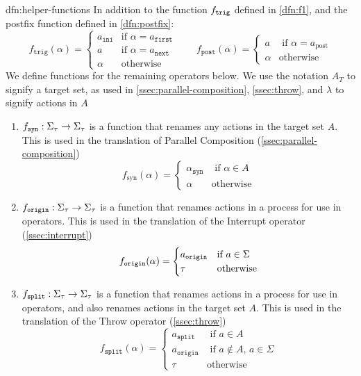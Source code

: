 \documentclass[../hons_project.tex]{subfiles}
\begin{document}
\begin{dfn}{dfn:helper-functions}{}
	In addition to the function $f_{\mathtt{trig}}$ defined in \ref{dfn:f1}, and the postfix function defined in \ref{dfn:postfix}:
	\vspace{-8pt}
	\[f_{\mathtt{trig}}(\alpha) = \begin{cases}
			a_{\mathtt{ini}} & \text{if } \alpha = a_{\mathtt{first}} \\
			a                & \text{if } \alpha = a_{\mathtt{next}}  \\
			\alpha           & \text{otherwise}
		\end{cases} \qquad f_{\mathtt{post}}(\alpha) = \begin{cases}
			a      & \text{ if } \alpha = a_{\mathrm{post}} \\
			\alpha & \text{otherwise}
		\end{cases}\]
	We define functions for the remaining operators below. We use the notation $A_{T}$ to signify a target set, as used in \ref{ssec:parallel-composition}, \ref{ssec:throw}, and $\lambda$ to signify actions in $A$

	\begin{enumerate}
		\item $f_{\mathtt{syn}} : \Sigma_{\tau} \to \Sigma_{\tau}$ is a function that renames any actions in the target set $A$. This is used in the translation of Parallel Composition (\ref{ssec:parallel-composition})
		      \vspace{-5pt}
		      \[
			      f_{\mathrm{syn}}(\alpha) = \begin{cases}
				      \alpha_{\mathtt{syn}} & \text{ if } \alpha\in A \\
				      \alpha                & \text{otherwise}
			      \end{cases}
		      \]
		\item $f_{\mathtt{origin}} : \Sigma_{\tau} \to \Sigma_{\tau}$ is a function that renames actions in a process for use in operators. This is used in the translation of the Interrupt operator (\ref{ssec:interrupt})
		      \vspace{-5pt}
		      \[f_{\mathtt{origin}}(\alpha) = \begin{cases}
				      a_{\mathtt{origin}} & \text{if } a\in\Sigma \\
				      \tau                & \text{otherwise}
			      \end{cases}\]
		\item $f_{\mathtt{split}} : \Sigma_{\tau} \to \Sigma_{\tau}$ is a function that renames actions in a process for use in operators, and also renames actions in the target set $A$. This is used in the translation of the Throw operator (\ref{ssec:throw})
		      \[
			      f_{\mathtt{split}}(\alpha) = \begin{cases}
				      a_{\mathtt{split}}  & \text{ if } a\in A                    \\
				      a_{\mathtt{origin}} & \text{ if } a\not\in A,\, a\in \Sigma \\
				      \tau                & \mathrm{otherwise}
			      \end{cases}
		      \]
	\end{enumerate}
\end{dfn}
\end{document}
